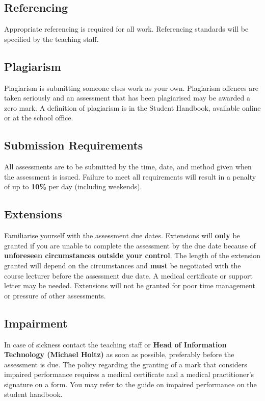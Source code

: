 \documentclass{article}
\begin{document}
\subsection*{Referencing}
Appropriate referencing is required for all work. Referencing standards will be specified by the teaching staff.

\subsection*{Plagiarism}
Plagiarism is submitting someone elses work as your own. Plagiarism offences are taken seriously and an assessment that has been plagiarised may be awarded a zero mark. A definition of plagiarism is in the Student Handbook, available online or at the school office.

\subsection*{Submission Requirements}
All assessments are to be submitted by the time, date, and method given when the assessment is issued. Failure to meet all requirements will result in a penalty of up to \textbf{10\%} per day (including weekends).

\subsection*{Extensions}
Familiarise yourself with the assessment due dates. Extensions will \textbf{only} be granted if you are unable to complete the assessment by the due date because of \textbf{unforeseen circumstances outside your control}. The length of the extension granted will depend on the circumstances and \textbf{must} be negotiated with the course lecturer before the assessment due date. A medical certificate or support letter may be needed. Extensions will not be granted for poor time management or pressure of other assessments.

\subsection*{Impairment}
In case of sickness contact the teaching staff or \textbf{Head of Information Technology (Michael Holtz)} as soon as possible, preferably before the assessment is due. The policy regarding the granting of a mark that considers impaired performance requires a medical certificate and a medical practitioner’s signature on a form. You may refer to the guide on impaired performance on the student handbook.
\end{document}
